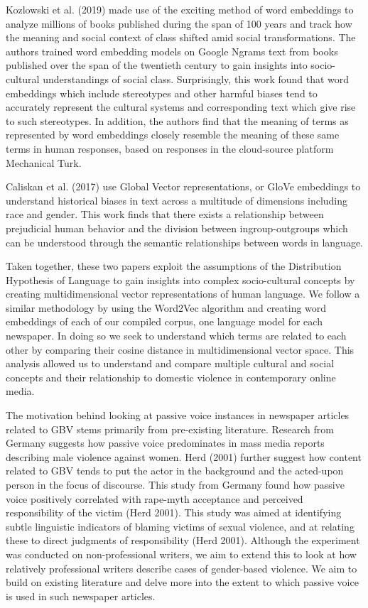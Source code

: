 \documentclass{article}
\begin{document}
{{Kozlowski et al. (2019) made use of the exciting method of word embeddings to analyze millions of books published during the span of 100 years and track how the meaning and social context of class shifted amid social transformations.  The authors trained word embedding models on Google Ngrams text from books published over the span of the twentieth century to gain insights into socio-cultural understandings of social class. Surprisingly, this work found that word embeddings which include stereotypes and other harmful biases tend to accurately represent the cultural systems and corresponding text which give rise to such stereotypes. In addition, the authors find that the meaning of terms as represented by word embeddings closely resemble the meaning of these same terms in human responses, based on responses in the cloud-source platform Mechanical Turk. 
	
Caliskan et al. (2017) use Global Vector representations, or GloVe embeddings to understand historical biases in text across a multitude of dimensions including race and gender. This work finds that there exists a relationship between prejudicial human behavior and the division between ingroup-outgroups which can be understood through the semantic relationships between words in language.
	
Taken together, these two papers exploit the assumptions of the Distribution Hypothesis of Language to gain insights into complex socio-cultural concepts by creating multidimensional vector representations of human language. We follow a similar methodology by using the Word2Vec algorithm and creating word embeddings of each of our compiled corpus, one language model for each newspaper. In doing so we seek to understand which terms are related to each other by comparing their cosine distance in multidimensional vector space.  This analysis allowed us to understand and compare multiple cultural and social concepts and their relationship to domestic violence in contemporary online media. 

The motivation behind looking at passive voice instances in newspaper articles related to GBV stems primarily from pre-existing literature. Research from Germany suggests how passive voice predominates in mass media reports describing male violence against women. Herd (2001) further suggest how content related to GBV tends to put the actor in the background and the acted-upon person in the focus of discourse. This study from Germany found how passive voice positively correlated with rape-myth acceptance and perceived responsibility of the victim (Herd 2001). This study was aimed at identifying subtle linguistic indicators of blaming victims of sexual violence, and at relating these to direct judgments of responsibility (Herd 2001). Although the experiment was conducted on non-professional writers, we aim to extend this to look at how relatively professional writers describe cases of gender-based violence. We aim to build on existing literature and delve more into the extent to which passive voice is used in such newspaper articles.

}}
\end{document}
